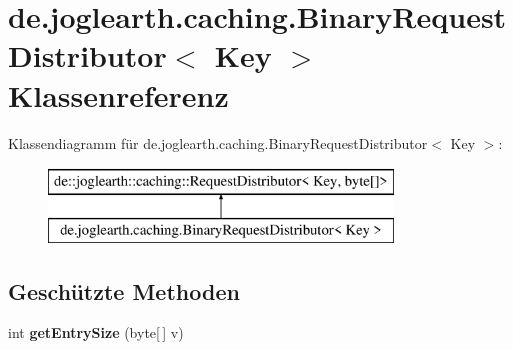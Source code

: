 \section{de.\-joglearth.\-caching.\-Binary\-Request\-Distributor$<$ Key $>$ Klassenreferenz}
\label{classde_1_1joglearth_1_1caching_1_1_binary_request_distributor_3_01_key_01_4}
Klassendiagramm für de.\-joglearth.\-caching.\-Binary\-Request\-Distributor$<$ Key $>$\-:\begin{figure}[H]
\begin{center}
\leavevmode
\includegraphics[height=2.000000cm]{classde_1_1joglearth_1_1caching_1_1_binary_request_distributor_3_01_key_01_4}
\end{center}
\end{figure}
\subsection*{Geschützte Methoden}
\begin{DoxyCompactItemize}
\item 
int {\bfseries get\-Entry\-Size} (byte[$\,$] v)\label{classde_1_1joglearth_1_1caching_1_1_binary_request_distributor_3_01_key_01_4_a6ed84c345f9173742c5982bc455c7325}

\end{DoxyCompactItemize}
